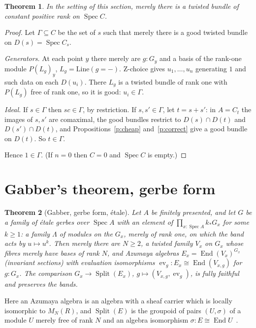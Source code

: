 \documentclass[11pt]{amsart}
\newtheorem{theorem}{Theorem}[section]
\theoremstyle{definition}
\theoremstyle{remark}
\newcommand{\Spec}{\operatorname{Spec}}
\newcommand{\End}{\operatorname{End}}
\newcommand{\Split}{\operatorname{Split}}
\newcommand{\ev}{\operatorname{ev}}
\newcommand{\Mat}{M_N(R)}
\begin{document}
\begin{theorem}\label{t:main}
In the setting of this section, merely there is a twisted bundle of
constant positive rank on $\Spec C$.
\end{theorem}
\begin{proof}
Let $\Gamma\subseteq C$ be the set of $s$ such that merely there is a good
twisted bundle on $D(s)=\Spec C_s$.

\emph{Generators.} At each point $y$ there merely are $g:G_y$ and a basis of
the rank-one module $P(L_g)_y$, $L_g=\mathrm{Line}(g=-)$. Z-choice gives
$u_1,\dots,u_n$ generating $1$ and such data on each $D(u_i)$. There
$L_g$ is a twisted bundle of rank one with $P(L_g)$ free of rank one, so
it is good: $u_i\in\Gamma$.

\emph{Ideal.} If $s\in\Gamma$ then $sc\in\Gamma$, by restriction. If
$s,s'\in\Gamma$, let $t=s+s'$: in $A=C_t$ the images of $s,s'$ are
comaximal, the good bundles restrict to $D(s)\cap D(t)$ and
$D(s')\cap D(t)$, and Propositions~\ref{p:cheap} and~\ref{p:correct} give
a good bundle on $D(t)$. So $t\in\Gamma$.

Hence $1\in\Gamma$. (If $n=0$ then $C=0$ and $\Spec C$ is empty.)
\end{proof}

\section{Gabber's theorem, gerbe form}

\begin{theorem}[Gabber, gerbe form, \'etale]\label{t:gerbe}
Let $A$ be finitely presented, and let $G$ be a family of \'etale gerbes
over $\Spec A$ with an element of $\prod_{x:\Spec A}k_*G_x$ for some
$k\geq1$: a family $\Lambda$ of modules on the $G_x$, merely of rank one,
on which the band acts by $u\mapsto u^k$. Then merely there are $N\geq2$,
a twisted family $V_x$ on $G_x$ whose fibres merely have bases of rank
$N$, and Azumaya algebras $E_x=\End(V_x)^{G_x}$ (invariant sections) with
evaluation isomorphisms $\ev_g:E_x\cong\End(V_{x,g})$ for $g:G_x$. The
comparison $G_x\to\Split(E_x)$, $g\mapsto(V_{x,g},\ev_g)$, is fully
faithful and preserves the bands.
\end{theorem}

Here an Azumaya algebra is an algebra with a sheaf carrier which is
locally isomorphic to $\Mat$, and $\Split(E)$ is the groupoid of pairs
$(U,\sigma)$ of a module $U$ merely free of rank $N$ and an algebra
isomorphism $\sigma:E\cong\End U$~\cite{h2}.
\end{document}
